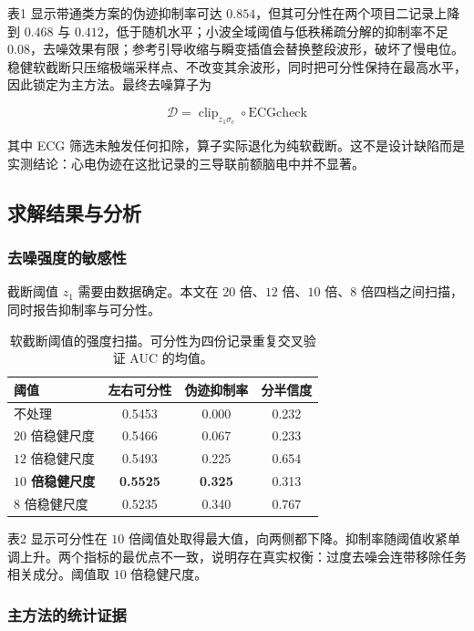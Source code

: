 \documentclass[bwprint]{gmcmthesis}
\begin{document}
表1 显示带通类方案的伪迹抑制率可达 $0.854$，但其可分性在两个项目二记录上降到 $0.468$ 与 $0.412$，低于随机水平；小波全域阈值与低秩稀疏分解的抑制率不足 $0.08$，去噪效果有限；参考引导收缩与瞬变插值会替换整段波形，破坏了慢电位。稳健软截断只压缩极端采样点、不改变其余波形，同时把可分性保持在最高水平，因此锁定为主方法。最终去噪算子为

\begin{equation}
\mathcal{D} = \operatorname{clip}_{z_1\sigma_c}\circ \mathrm{ECGcheck}
\end{equation}

其中 ECG 筛选未触发任何扣除，算子实际退化为纯软截断。这不是设计缺陷而是实测结论：心电伪迹在这批记录的三导联前额脑电中并不显著。

\subsection{求解结果与分析}

\subsubsection{去噪强度的敏感性}

截断阈值 $z_1$ 需要由数据确定。本文在 $20$ 倍、$12$ 倍、$10$ 倍、$8$ 倍四档之间扫描，同时报告抑制率与可分性。

\begin{table}[htp!]
\centering
\renewcommand\arraystretch{1.2}
\caption{软截断阈值的强度扫描。可分性为四份记录重复交叉验证 AUC 的均值。}
\begin{tabular}{|l|c|c|c|}
  \hline
  阈值 & 左右可分性 & 伪迹抑制率 & 分半信度 \\
  \hline
  不处理 & 0.5453 & 0.000 & 0.232 \\
  \hline
  $20$ 倍稳健尺度 & 0.5466 & 0.067 & 0.233 \\
  \hline
  $12$ 倍稳健尺度 & 0.5493 & 0.225 & 0.654 \\
  \hline
  \textbf{$10$ 倍稳健尺度} & \textbf{0.5525} & \textbf{0.325} & 0.313 \\
  \hline
  $8$ 倍稳健尺度 & 0.5235 & 0.340 & 0.767 \\
  \hline
\end{tabular}
\end{table}

表2 显示可分性在 $10$ 倍阈值处取得最大值，向两侧都下降。抑制率随阈值收紧单调上升。两个指标的最优点不一致，说明存在真实权衡：过度去噪会连带移除任务相关成分。阈值取 $10$ 倍稳健尺度。

\subsubsection{主方法的统计证据}
\end{document}
